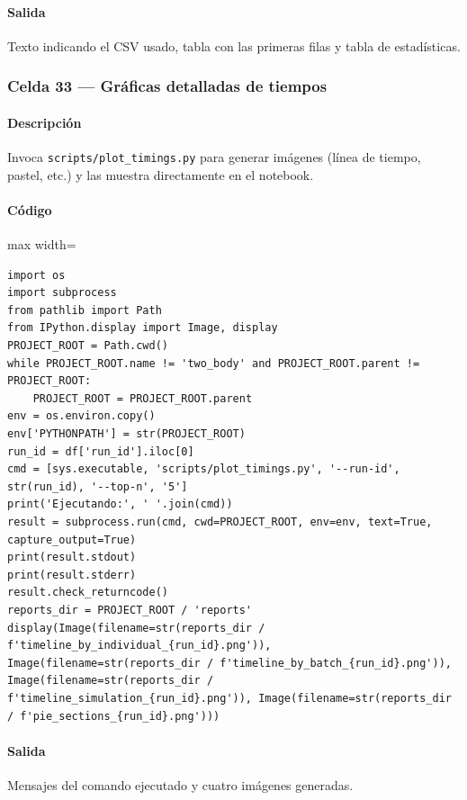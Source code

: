 \paragraph{Salida} Texto indicando el CSV usado, tabla con las primeras filas y tabla de estadísticas.

\subsubsection*{Celda 33 — Gráficas detalladas de tiempos}
\paragraph{Descripción} Invoca \texttt{scripts/plot\_timings.py} para generar imágenes (línea de tiempo, pastel, etc.) y las muestra directamente en el notebook.
\paragraph{Código}
\begin{listing}[H]
\caption{Celda 33: ejecución de \texttt{plot\_timings.py} y despliegue de gráficos}
\begin{adjustbox}{max width=\textwidth}
\begin{minipage}{\textwidth}
\begin{verbatim}
import os
import subprocess
from pathlib import Path
from IPython.display import Image, display
PROJECT_ROOT = Path.cwd()
while PROJECT_ROOT.name != 'two_body' and PROJECT_ROOT.parent != PROJECT_ROOT:
    PROJECT_ROOT = PROJECT_ROOT.parent
env = os.environ.copy()
env['PYTHONPATH'] = str(PROJECT_ROOT)
run_id = df['run_id'].iloc[0]
cmd = [sys.executable, 'scripts/plot_timings.py', '--run-id', str(run_id), '--top-n', '5']
print('Ejecutando:', ' '.join(cmd))
result = subprocess.run(cmd, cwd=PROJECT_ROOT, env=env, text=True, capture_output=True)
print(result.stdout)
print(result.stderr)
result.check_returncode()
reports_dir = PROJECT_ROOT / 'reports'
display(Image(filename=str(reports_dir / f'timeline_by_individual_{run_id}.png')), Image(filename=str(reports_dir / f'timeline_by_batch_{run_id}.png')), Image(filename=str(reports_dir / f'timeline_simulation_{run_id}.png')), Image(filename=str(reports_dir / f'pie_sections_{run_id}.png')))
\end{verbatim}
\end{minipage}
\end{adjustbox}
\end{listing}
\paragraph{Salida} Mensajes del comando ejecutado y cuatro imágenes generadas.

